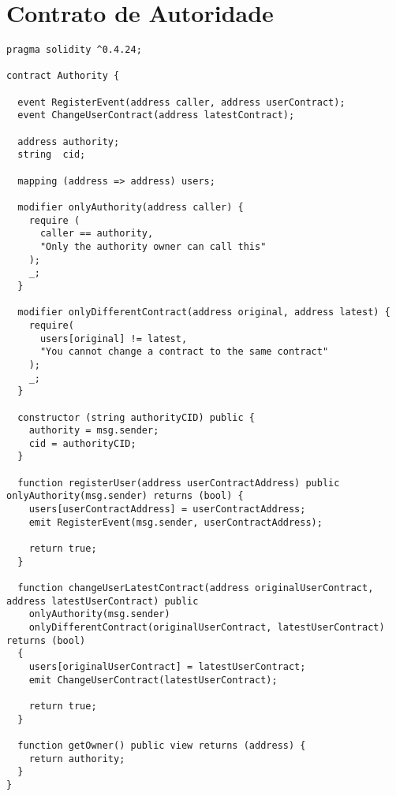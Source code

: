 \chapter{Contrato de Autoridade}\label{anexo:contrato-autoridade}

\begin{lstlisting}
pragma solidity ^0.4.24;

contract Authority {

  event RegisterEvent(address caller, address userContract);
  event ChangeUserContract(address latestContract);

  address authority;
  string  cid;

  mapping (address => address) users;

  modifier onlyAuthority(address caller) {
    require (
      caller == authority,
      "Only the authority owner can call this"
    );
    _;
  }

  modifier onlyDifferentContract(address original, address latest) {
    require(
      users[original] != latest,
      "You cannot change a contract to the same contract"
    );
    _;
  }

  constructor (string authorityCID) public {
    authority = msg.sender;
    cid = authorityCID;
  }

  function registerUser(address userContractAddress) public onlyAuthority(msg.sender) returns (bool) {
    users[userContractAddress] = userContractAddress;
    emit RegisterEvent(msg.sender, userContractAddress);

    return true;
  }

  function changeUserLatestContract(address originalUserContract, address latestUserContract) public 
    onlyAuthority(msg.sender)
    onlyDifferentContract(originalUserContract, latestUserContract) returns (bool) 
  {  
    users[originalUserContract] = latestUserContract;
    emit ChangeUserContract(latestUserContract);

    return true;
  }

  function getOwner() public view returns (address) {
    return authority;
  }
}
\end{lstlisting}